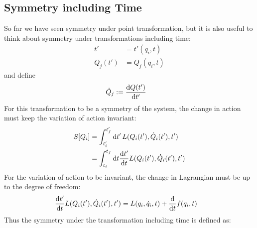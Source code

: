 \subsection{Symmetry including Time}
So far we have seen symmetry under point transformation, but it is also useful to think about symmetry under transformations including time:
\begin{align}
  t'      & = t'(q_i, t)  \\
  Q_j(t') & = Q_j(q_i, t)
\end{align}
and define
\begin{align}
  \dot{Q}_j & := \odv{Q(t')}{t'}
\end{align}
For this transformation to be a symmetry of the system, the change in action must keep the variation of action invariant:
\begin{align}
  S[Q_i] & = \int_{t_i'}^{t_f'} \odif{t'} \, L(Q_i(t'), \dot{Q}_i(t'), t')       \\
         & = \int_{t_i}^{t_f} \odif{t} \odv{t'}{t} L(Q_i(t'), \dot{Q}_i(t'), t')
\end{align}
For the variation of action to be invariant, the change in Lagrangian must be up to the degree of freedom:
\begin{align}
  \odv{t'}{t} L(Q_i(t'), \dot{Q}_i(t'), t') & = L(q_i, \dot{q}_i, t) + \odv{}{t} f(q_i, t)
\end{align}
Thus the symmetry under the transformation including time is defined as:

